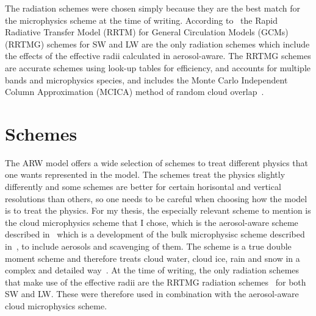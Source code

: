 The radiation schemes were chosen simply because they are the best match for the microphysics scheme at the time of writing. According to~\citet{Thompson2014} the Rapid Radiative Transfer Model (RRTM) for General Circulation Models (GCMs) (RRTMG) schemes for SW and LW are the only radiation schemes which include the effects of the effective radii calculated in aerosol-aware. The RRTMG schemes are accurate schemes using look-up tables for efficiency, and accounts for multiple bands and microphysics species, and includes the Monte Carlo Independent Column Approximation (MCICA) method of random cloud overlap~\citep{Wang2015}.%

\section{Schemes}
\label{sec:schemes}
The ARW model offers a wide selection of schemes to treat different physics that one wants represented in the model. The schemes treat the physics slightly differently and some schemes are better for certain horisontal and vertical resolutions than others, so one needs to be careful when choosing how the model is to treat the physics. For my thesis, the especially relevant scheme to mention is the cloud microphysics scheme that I chose, which is the aerosol-aware scheme described in~\citet{Thompson2014} which is a development of the bulk microphysisc scheme described in~\citet{Thompson2008}, to include aerosols and scavenging of them. The scheme is a true double moment scheme and therefore treats cloud water, cloud ice, rain and snow in a complex and detailed way~\citep{Thompson2014}. At the time of writing, the only radiation schemes that make use of the effective radii are the RRTMG radiation schemes~\citep{Mlawer1997, Iacono2000, Iacono2003, Iacono2008} for both SW and LW. These were therefore used in combination with the aerosol-aware cloud microphysics scheme.

